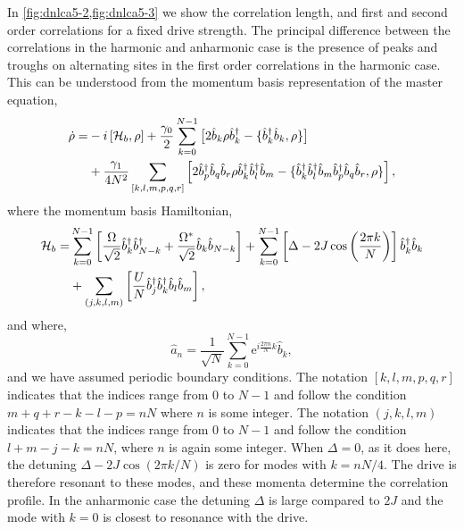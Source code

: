 In \cref{fig:dnlca5-2,fig:dnlca5-3} we show the correlation length, and first and second order correlations for a fixed drive strength. The principal difference between the correlations in the harmonic and anharmonic case is the presence of peaks and troughs on alternating sites in the first order correlations in the harmonic case. This can be understood from the momentum basis representation of the master equation,
\begin{align}
	\dot{\rho} = &-i\left[\mathcal{H}_{b}, \rho\right] + \frac{\gamma_{0}}{2}\sum_{k=0}^{N-1}\big[2\hat{b}_{k}\rho\hat{b}_{k}^{\dagger} - \{\hat{b}_{k}^{\dagger}\hat{b}_{k}, \rho\}\big] \notag \\
	&+ \frac{\gamma_{1}}{4N^{2}} \sum_{[k,l,m,p,q,r]} \left[ 2\hat{b}_{p}^{\dagger}\hat{b}_{q}\hat{b}_{r}\rho\hat{b}_{k}^{\dagger}\hat{b}_{l}^{\dagger}\hat{b}_{m} - \{\hat{b}_{k}^{\dagger}\hat{b}_{l}^{\dagger}\hat{b}_{m}\hat{b}_{p}^{\dagger}\hat{b}_{q}\hat{b}_{r}, \rho\} \right],
	\label{eq:dnlca5-3}
\end{align}
where the momentum basis Hamiltonian,
\begin{align}
	\mathcal{H}_{b} = &\sum_{k=0}^{N-1} \left[ \frac{\Omega}{\sqrt{2}}\hat{b}_{k}^{\dagger}\hat{b}_{N-k}^{\dagger} + \frac{\Omega^{*}}{\sqrt{2}}\hat{b}_{k}\hat{b}_{N-k} \right] + \sum_{k=0}^{N-1} \left[\Delta - 2J\cos\left(\frac{2\pi k}{N}\right)\right]\hat{b}_{k}^{\dagger}\hat{b}_{k} \notag \\
	&+ \sum_{(j,k,l,m)} \left[ \frac{U}{N} \hat{b}_{j}^{\dagger}\hat{b}_{k}^{\dagger}\hat{b}_{l}\hat{b}_{m} \right],
	\label{eq:dnlca5-1}
\end{align}
and where,
\begin{equation}
	\hat{a}_{n} = \frac{1}{\sqrt{N}} \sum_{k=0}^{N-1} \mathrm{e}^{i\frac{2\pi n}{N}k}\hat{b}_{k},
	\label{eq:dnlca5-2}
\end{equation}
and we have assumed periodic boundary conditions. The notation \([k,l,m,p,q,r]\) indicates that the indices range from \(0\) to \(N-1\) and follow the condition \(m+q+r-k-l-p = nN\) where \(n\) is some integer. The notation \((j,k,l,m)\) indicates that the indices range from \(0\) to \(N-1\) and follow the condition \(l+m-j-k = nN\), where \(n\) is again some integer. When \(\Delta = 0\), as it does here, the detuning \(\Delta - 2J\cos (2 \pi k/N)\) is zero for modes with \(k = nN/4\). The drive is therefore resonant to these modes, and these momenta determine the correlation profile. In the anharmonic case the detuning \(\Delta\) is large compared to \(2J\) and the mode with \(k=0\) is closest to resonance with the drive.

